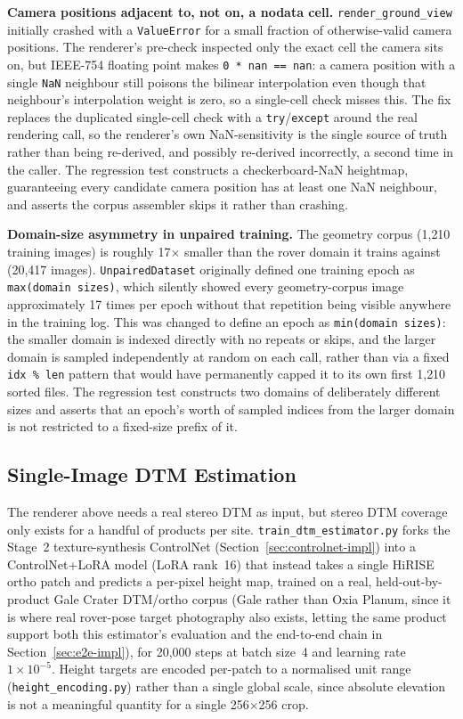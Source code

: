\textbf{Camera positions adjacent to, not on, a nodata cell.} \texttt{render\_ground\_view} initially crashed with a \texttt{ValueError} for a small fraction of otherwise-valid camera positions. The renderer's pre-check inspected only the exact cell the camera sits on, but IEEE-754 floating point makes \texttt{0 * nan == nan}: a camera position with a single \texttt{NaN} neighbour still poisons the bilinear interpolation even though that neighbour's interpolation weight is zero, so a single-cell check misses this. The fix replaces the duplicated single-cell check with a \texttt{try}/\texttt{except} around the real rendering call, so the renderer's own NaN-sensitivity is the single source of truth rather than being re-derived, and possibly re-derived incorrectly, a second time in the caller. The regression test constructs a checkerboard-NaN heightmap, guaranteeing every candidate camera position has at least one NaN neighbour, and asserts the corpus assembler skips it rather than crashing.

\textbf{Domain-size asymmetry in unpaired training.} The geometry corpus (1{,}210 training images) is roughly 17$\times$ smaller than the rover domain it trains against (20{,}417 images). \texttt{UnpairedDataset} originally defined one training epoch as \texttt{max(domain sizes)}, which silently showed every geometry-corpus image approximately 17 times per epoch without that repetition being visible anywhere in the training log. This was changed to define an epoch as \texttt{min(domain sizes)}: the smaller domain is indexed directly with no repeats or skips, and the larger domain is sampled independently at random on each call, rather than via a fixed \texttt{idx \% len} pattern that would have permanently capped it to its own first 1{,}210 sorted files. The regression test constructs two domains of deliberately different sizes and asserts that an epoch's worth of sampled indices from the larger domain is not restricted to a fixed-size prefix of it.

\subsection{Single-Image DTM Estimation}
\label{sec:dtmestimator-impl}

The renderer above needs a real stereo DTM as input, but stereo DTM coverage only exists for a handful of products per site. \texttt{train\_dtm\_estimator.py} forks the Stage~2 texture-synthesis ControlNet (Section~\ref{sec:controlnet-impl}) into a ControlNet+LoRA model (LoRA rank~16) that instead takes a single HiRISE ortho patch and predicts a per-pixel height map, trained on a real, held-out-by-product Gale Crater DTM/ortho corpus (Gale rather than Oxia Planum, since it is where real rover-pose target photography also exists, letting the same product support both this estimator's evaluation and the end-to-end chain in Section~\ref{sec:e2e-impl}), for 20,000 steps at batch size~4 and learning rate~$1{\times}10^{-5}$. Height targets are encoded per-patch to a normalised unit range (\texttt{height\_encoding.py}) rather than a single global scale, since absolute elevation is not a meaningful quantity for a single 256$\times$256 crop.

